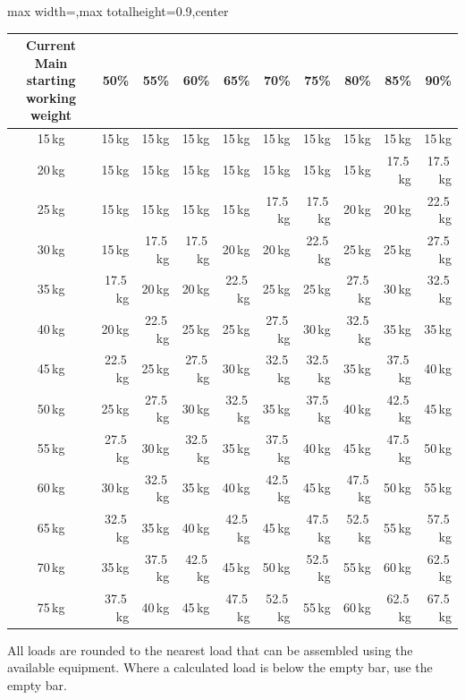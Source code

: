 \documentclass[11pt,a4paper]{article}
\newcommand{\tablearraystretch}{1.15}
\begin{document}
\begin{center}
\renewcommand{\arraystretch}{\tablearraystretch}
\begin{adjustbox}{max width=\linewidth,max totalheight=0.9\textheight,center}
\begin{tabular}{crrrrrrrrr}
\toprule
Current Main starting working weight & 50\% & 55\% & 60\% & 65\% & 70\% & 75\% & 80\% & 85\% & 90\% \\
\midrule
15\,kg & 15\,kg & 15\,kg & 15\,kg & 15\,kg & 15\,kg & 15\,kg & 15\,kg & 15\,kg & 15\,kg \\
20\,kg & 15\,kg & 15\,kg & 15\,kg & 15\,kg & 15\,kg & 15\,kg & 15\,kg & 17.5\,kg & 17.5\,kg \\
25\,kg & 15\,kg & 15\,kg & 15\,kg & 15\,kg & 17.5\,kg & 17.5\,kg & 20\,kg & 20\,kg & 22.5\,kg \\
30\,kg & 15\,kg & 17.5\,kg & 17.5\,kg & 20\,kg & 20\,kg & 22.5\,kg & 25\,kg & 25\,kg & 27.5\,kg \\
35\,kg & 17.5\,kg & 20\,kg & 20\,kg & 22.5\,kg & 25\,kg & 25\,kg & 27.5\,kg & 30\,kg & 32.5\,kg \\
40\,kg & 20\,kg & 22.5\,kg & 25\,kg & 25\,kg & 27.5\,kg & 30\,kg & 32.5\,kg & 35\,kg & 35\,kg \\
45\,kg & 22.5\,kg & 25\,kg & 27.5\,kg & 30\,kg & 32.5\,kg & 32.5\,kg & 35\,kg & 37.5\,kg & 40\,kg \\
50\,kg & 25\,kg & 27.5\,kg & 30\,kg & 32.5\,kg & 35\,kg & 37.5\,kg & 40\,kg & 42.5\,kg & 45\,kg \\
55\,kg & 27.5\,kg & 30\,kg & 32.5\,kg & 35\,kg & 37.5\,kg & 40\,kg & 45\,kg & 47.5\,kg & 50\,kg \\
60\,kg & 30\,kg & 32.5\,kg & 35\,kg & 40\,kg & 42.5\,kg & 45\,kg & 47.5\,kg & 50\,kg & 55\,kg \\
65\,kg & 32.5\,kg & 35\,kg & 40\,kg & 42.5\,kg & 45\,kg & 47.5\,kg & 52.5\,kg & 55\,kg & 57.5\,kg \\
70\,kg & 35\,kg & 37.5\,kg & 42.5\,kg & 45\,kg & 50\,kg & 52.5\,kg & 55\,kg & 60\,kg & 62.5\,kg \\
75\,kg & 37.5\,kg & 40\,kg & 45\,kg & 47.5\,kg & 52.5\,kg & 55\,kg & 60\,kg & 62.5\,kg & 67.5\,kg \\
\bottomrule
\end{tabular}
\end{adjustbox}
\renewcommand{\arraystretch}{1}
\end{center}

All loads are rounded to the nearest load that can be assembled using the available equipment. Where a calculated load is below the empty bar, use the empty bar.
\end{document}
